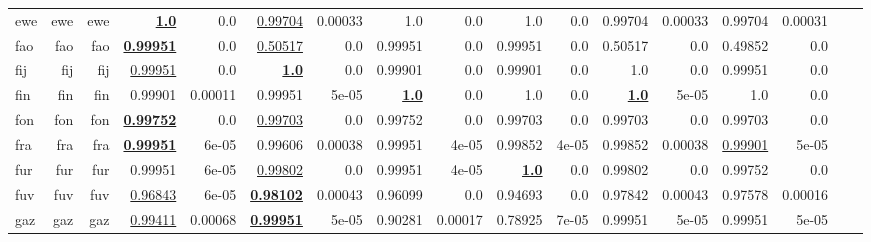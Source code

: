 \documentclass[11pt]{article}
\begin{document}
\begin{table*}[h]
{\begin{tabular}{lrrrrrrrrrrrrrrrr}
ewe         & ewe         & ewe         & \textbf{\underline{1.0}}         & 0.0         & \underline{0.99704}         & 0.00033         & 1.0         & 0.0         & 1.0         & 0.0         & 0.99704         & 0.00033         & 0.99704         & 0.00031         \\
fao         & fao         & fao         & \textbf{\underline{0.99951}}         & 0.0         & \underline{0.50517}         & 0.0         & 0.99951         & 0.0         & 0.99951         & 0.0         & 0.50517         & 0.0         & 0.49852         & 0.0         \\
fij         & fij         & fij         & \underline{0.99951}         & 0.0         & \textbf{\underline{1.0}}         & 0.0         & 0.99901         & 0.0         & 0.99901         & 0.0         & 1.0         & 0.0         & 0.99951         & 0.0         \\
fin         & fin         & fin         & 0.99901         & 0.00011         & 0.99951         & 5e-05         & \textbf{\underline{1.0}}         & 0.0         & 1.0         & 0.0         & \textbf{\underline{1.0}}         & 5e-05         & 1.0         & 0.0         \\
fon         & fon         & fon         & \textbf{\underline{0.99752}}         & 0.0         & \underline{0.99703}         & 0.0         & 0.99752         & 0.0         & 0.99703         & 0.0         & 0.99703         & 0.0         & 0.99703         & 0.0         \\
fra         & fra         & fra         & \textbf{\underline{0.99951}}         & 6e-05         & 0.99606         & 0.00038         & 0.99951         & 4e-05         & 0.99852         & 4e-05         & 0.99852         & 0.00038         & \underline{0.99901}         & 5e-05         \\
fur         & fur         & fur         & 0.99951         & 6e-05         & \underline{0.99802}         & 0.0         & 0.99951         & 4e-05         & \textbf{\underline{1.0}}         & 0.0         & 0.99802         & 0.0         & 0.99752         & 0.0         \\
fuv         & fuv         & fuv         & \underline{0.96843}         & 6e-05         & \textbf{\underline{0.98102}}         & 0.00043         & 0.96099         & 0.0         & 0.94693         & 0.0         & 0.97842         & 0.00043         & 0.97578         & 0.00016         \\
gaz         & gaz         & gaz         & \underline{0.99411}         & 0.00068         & \textbf{\underline{0.99951}}         & 5e-05         & 0.90281         & 0.00017         & 0.78925         & 7e-05         & 0.99951         & 5e-05         & 0.99951         & 5e-05         \\

\end{tabular}}
\end{table*}
\end{document}
